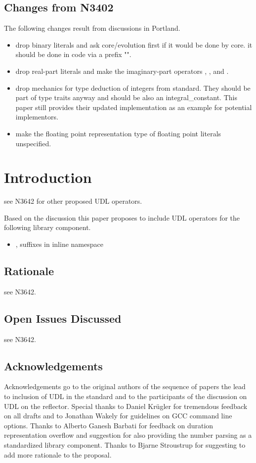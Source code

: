 \documentclass[ebook,11pt,article]{memoir}
\begin{document}
\section{Changes from N3402}
The following changes result from discussions in Portland.
\begin{itemize}
\item drop binary literals and ask core/evolution first if it would be done by core. it should be done in code via a prefix "".
\item drop real-part  literals  and make the imaginary-part operators , , and .
\item drop mechanics for type deduction of integers from standard. They should be part of type traits anyway and should be also an integral\_constant. This paper still provides their updated implementation as an example for potential implementors.
\item make the floating point representation type of  floating point literals unspecified.
\end{itemize}


\chapter{Introduction}
see N3642 for other proposed UDL operators.

Based on the discussion this paper proposes to include UDL operators for the following library component.
\begin{itemize}
\item {}, suffixes  in inline namespace 
\end{itemize}

\section{Rationale}
see N3642.

\section{Open Issues Discussed}
see N3642.

\section{Acknowledgements}
Acknowledgements go to the original authors of the sequence of papers the lead to inclusion of UDL in the standard and to the participants of the discussion on UDL on the reflector. Special thanks to Daniel Kr\"ugler for tremendous feedback on all drafts and to Jonathan Wakely for guidelines on GCC command line options. Thanks to Alberto Ganesh Barbati for feedback on duration representation overflow and suggestion for also providing the number parsing as a standardized library component. Thanks to Bjarne Stroustrup for suggesting to add more rationale to the proposal.
\end{document}
